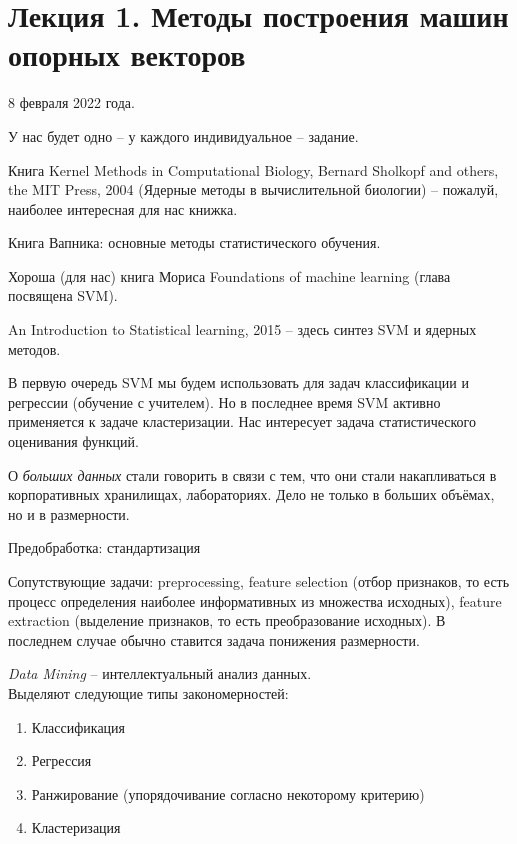 \documentclass[main.tex]{subfiles}
\begin{document}
\section{Лекция 1. Методы построения машин опорных векторов  }

8 февраля 2022 года.

\begin{leftbar}
	У нас будет одно -- у каждого индивидуальное -- задание.
	
	Книга Kernel Methods in Computational Biology, Bernard Sholkopf and others, the MIT Press, 2004 (Ядерные методы в вычислительной биологии) -- пожалуй, наиболее интересная для нас книжка.
	
	Книга Вапника: основные методы статистического обучения.
	
	Хороша (для нас) книга Мориса Foundations of machine learning (глава посвящена SVM).
	
	An Introduction to Statistical learning, 2015 -- здесь синтез SVM и ядерных методов.
\end{leftbar}


В первую очередь SVM мы будем использовать для задач классификации и регрессии (обучение с учителем).
Но в последнее время SVM активно применяется к задаче кластеризации.
Нас интересует задача статистического оценивания функций.

О \emph{больших данных} стали говорить в связи с тем, что они стали накапливаться в корпоративных хранилищах, лабораториях.
Дело не только в больших объёмах, но и в размерности.

Предобработка: стандартизация

Сопутствующие задачи: preprocessing, feature selection (отбор признаков, то есть процесс определения наиболее информативных из множества исходных), feature extraction (выделение признаков, то есть преобразование исходных).
В последнем случае обычно ставится задача понижения размерности.

\emph{Data Mining} -- интеллектуальный анализ данных. \\

Выделяют следующие типы закономерностей:

\begin{enumerate}[noitemsep]
	\item Классификация
	\item Регрессия
	\item Ранжирование (упорядочивание согласно некоторому критерию)
	\item Кластеризация
\end{enumerate}
\end{document}
